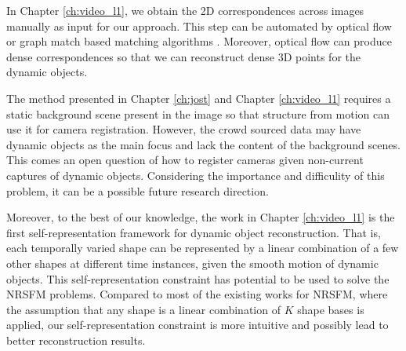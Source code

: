 In Chapter \ref{ch:video_l1}, we obtain the 2D correspondences across images manually as input for our approach. 
This step can be automated by optical flow \cite{brox2004high} or graph match based matching algorithms \cite{yan2015multi,Yan_2015_CVPR}. Moreover, optical flow can produce dense correspondences so that we can reconstruct dense 3D points for the dynamic objects. 

The method presented in Chapter \ref{ch:jost} and Chapter \ref{ch:video_l1} requires a static background scene present in the image so that structure from motion can use it for camera registration. However, the crowd sourced data may have dynamic objects as the main focus and lack the content of the background scenes. This comes an open question of how to register cameras given non-current captures of dynamic objects. Considering the importance and difficulity of this problem, it can be a possible future research direction.

Moreover, to the best of our knowledge, the work in Chapter \ref{ch:video_l1} is the first self-representation framework for dynamic object reconstruction. That is, each temporally varied shape can be represented by a linear combination of a few other shapes at different time instances, given the smooth motion of dynamic objects. This self-representation constraint has potential to be used to solve the NRSFM problems. Compared to most of the existing works for NRSFM, where the assumption that any shape is a linear combination of $K$ shape bases is applied, our self-representation constraint is more intuitive and possibly lead to better reconstruction results.
